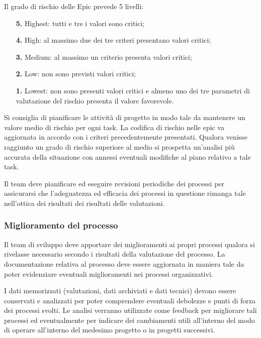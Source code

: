 Il grado di rischio delle Epic prevede 5 livelli:
\begin{enumerate}
    \item[\textbf{5.}] Highest: tutti e tre i valori sono critici;
    \item[\textbf{4.}] High: al massimo due dei tre criteri presentano valori critici;
    \item[\textbf{3.}] Medium: al massimo un criterio presenta valori critici;
    \item[\textbf{2.}] Low: non sono previsti valori critici;
    \item[\textbf{1.}] Lowest: non sono presenti valori critici e almeno uno dei tre parametri di valutazione del rischio presenta il valore favorevole.
\end{enumerate}

Si consiglia di pianificare le attività di progetto in modo tale da mantenere un valore medio di rischio per ogni task. La codifica di rischio nelle epic va aggiornata in accordo con i criteri precedentemente presentati. Qualora venisse raggiunto un grado di rischio superiore al medio si prospetta un'analisi più accurata della situazione con annessi eventuali modifiche al piano relativo a tale task.

Il team deve pianificare ed eseguire revisioni periodiche dei processi per assicurarsi che l'adeguatezza ed efficacia dei processi in questione rimanga tale nell'ottica dei risultati dei risultati delle valutazioni.

\subsubsection{Miglioramento del processo}

Il team di sviluppo deve apportare dei miglioramenti ai propri processi qualora si rivelasse necessario secondo i risultati della valutazione del processo. La documentazione relativa al processo deve essere aggiornata in maniera tale da poter evidenziare eventuali miglioramenti nei processi organizzativi.

I dati memorizzati (valutazioni, dati archiviati e dati tecnici) devono essere conservati e analizzati per poter comprendere eventuali debolezze e punti di forza dei processi svolti. Le analisi verranno utilizzate come feedback per migliorare tali processi ed eventualmente per indicare dei cambiamenti utili all'interno del modo di operare all'interno del medesimo progetto o in progetti successivi.
